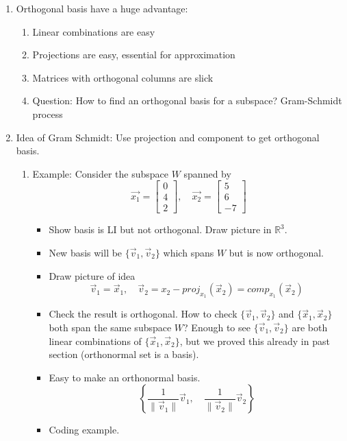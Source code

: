 \documentclass{article}
\begin{document}
\begin{enumerate}

\item Orthogonal basis have a huge advantage:
\begin{enumerate}
\item Linear combinations are easy
\item Projections are easy, essential for approximation
\item Matrices with orthogonal columns are slick
\item Question: How to find an orthogonal basis for a subspace? Gram-Schmidt process
\end{enumerate}


\item Idea of Gram Schmidt: Use projection and component to get orthogonal basis.
\begin{enumerate}

\item Example: Consider the subspace $W$ spanned by 
\[
\vec{x_1} = \left[
\begin{array}{c}
0 \\ 4 \\ 2 
\end{array}
\right], \quad
\vec{x_2} = \left[
\begin{array}{c}
5 \\ 6 \\ -7
\end{array}
\right]
\]
\begin{itemize}
\item Show basis is LI but not orthogonal. Draw picture in $\mathbb{R}^3$.
\item New basis will be $\{\vec{v}_1, \vec{v}_2 \}$ which spans $W$ but is now orthogonal.
\item Draw picture of idea
\[
\vec{v}_1 = \vec{x}_1, \quad \vec{v}_2 = x_2 - proj_{x_1}(\vec{x}_2) = comp_{x_1}(\vec{x}_2)
\]
\item Check the result is orthogonal. How to check $\{\vec{v}_1, \vec{v}_2 \}$ and $\{\vec{x}_1, \vec{x}_2 \}$ both span the same subspace $W$? Enough to see $\{\vec{v}_1, \vec{v}_2 \}$ are both linear combinations of $\{\vec{x}_1, \vec{x}_2 \}$, but we proved this already in past section (orthonormal set is a basis). 
\item Easy to make an orthonormal basis.
\[
\left\{\frac{1}{\|\vec{v}_1\|} \vec{v}_1, \quad \frac{1}{\|\vec{v}_2\|}\vec{v}_2 \right\}
\]
\item Coding example.
\end{itemize}


\end{enumerate}
\end{enumerate}
\end{document}
